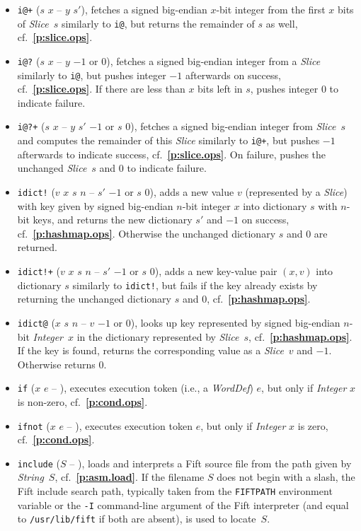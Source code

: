 \documentclass[12pt,oneside]{article}
\def\refpoint#1{{\rm\textbf{\ref{#1}}}}
\let\ptref=\refpoint
\begin{document}
\begin{itemize}
\item {\tt i@+} ($s$ $x$ -- $y$ $s'$), fetches a signed big-endian $x$-bit integer from the first $x$ bits of {\em Slice}~$s$ similarly to {\tt i@}, but returns the remainder of $s$ as well, cf.~\ptref{p:slice.ops}.
\item {\tt i@?} ($s$ $x$ -- $y$ $-1$ or $0$), fetches a signed big-endian integer from a {\em Slice\/} similarly to {\tt i@}, but pushes integer $-1$ afterwards on success, cf.~\ptref{p:slice.ops}. If there are less than $x$ bits left in $s$, pushes integer $0$ to indicate failure.
\item {\tt i@?+} ($s$ $x$ -- $y$ $s'$ $-1$ or $s$ $0$), fetches a signed big-endian integer from {\em Slice\/}~$s$ and computes the remainder of this {\em Slice\/} similarly to {\tt i@+}, but pushes $-1$ afterwards to indicate success, cf.~\ptref{p:slice.ops}. On failure, pushes the unchanged {\em Slice\/}~$s$ and $0$ to indicate failure.
\item {\tt idict!} ($v$ $x$ $s$ $n$ -- $s'$ $-1$ or $s$ $0$), adds a new value $v$ (represented by a {\em Slice\/}) with key given by signed big-endian $n$-bit integer $x$ into dictionary $s$ with $n$-bit keys, and returns the new dictionary $s'$ and $-1$ on success, cf.~\ptref{p:hashmap.ops}. Otherwise the unchanged dictionary $s$ and $0$ are returned.
\item {\tt idict!+} ($v$ $x$ $s$ $n$ -- $s'$ $-1$ or $s$ $0$), adds a new key-value pair $(x,v)$ into dictionary $s$ similarly to {\tt idict!}, but fails if the key already exists by returning the unchanged dictionary $s$ and $0$, cf.~\ptref{p:hashmap.ops}.
\item {\tt idict@} ($x$ $s$ $n$ -- $v$ $-1$ or $0$), looks up key represented by signed big-endian $n$-bit {\em Integer\/}~$x$ in the dictionary represented by {\em Slice\/}~$s$, cf.~\ptref{p:hashmap.ops}. If the key is found, returns the corresponding value as a {\em Slice\/}~$v$ and $-1$. Otherwise returns $0$.
\item {\tt if} ($x$ $e$ -- ), executes execution token (i.e., a {\em WordDef\/}) $e$, but only if {\em Integer\/} $x$ is non-zero, cf.~\ptref{p:cond.ops}.
\item {\tt ifnot} ($x$ $e$ -- ), executes execution token $e$, but only if {\em Integer\/} $x$ is zero, cf.~\ptref{p:cond.ops}.
\item {\tt include} ($S$ -- ), loads and interprets a Fift source file from the path given by {\em String\/}~$S$, cf.~\ptref{p:asm.load}. If the filename $S$ does not begin with a slash, the Fift include search path, typically taken from the {\tt FIFTPATH} environment variable or the {\tt -I} command-line argument of the Fift interpreter (and equal to {\tt /usr/lib/fift} if both are absent), is used to locate~$S$.

\end{itemize}
\end{document}
